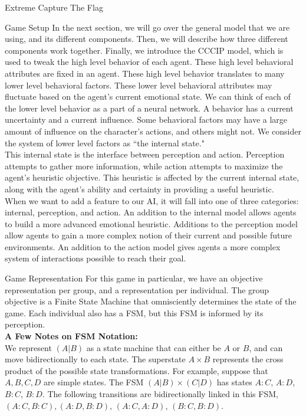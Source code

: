 \documentclass[11pt]{article}
\begin{document}
\begin{section}{Extreme Capture The Flag}
\begin{subsection}{Game Setup}
In the next section, we will go over the general model that we are using, and its different components. Then, we will describe how three different components work together. Finally, we introduce the CCCIP model, which is used to tweak the high level behavior of each agent. These high level behavioral attributes are fixed in an agent. These high level behavior translates to many lower level behavioral factors. These lower level behavioral attributes may fluctuate based on the agent's current emotional state. We can think of each of the lower level behavior as a part of a neural network. A behavior has a current uncertainty and a current influence. Some behavioral factors may have a large amount of influence on the character's actions, and others might not. We consider the system of lower level factors as ``the internal state."\\

This internal state is the interface between perception and action. Perception attempts to gather more information, while action attempts to maximize the agent's heuristic objective. This heuristic is affected by the current internal state, along with the agent's ability and certainty in providing a useful heuristic.\\

When we want to add a feature to our AI, it will fall into one of three categories: internal, perception, and action. An addition to the internal model allows agents to build a more advanced emotional heuristic. Additions to the perception model allow agents to gain a more complex notion of their current and possible future environments. An addition to the action model gives agents a more complex system of interactions possible to reach their goal.\\  
\end{subsection}
\begin{subsection}{Game Representation}
For this game in particular, we have an objective representation per group, and a representation per individual. The group objective is a Finite State Machine that omnisciently determines the state of the game. Each individual also has a FSM, but this FSM is informed by its perception. \\

\textbf{A Few Notes on FSM Notation:}\\
We represent $(A | B)$ as a state machine that can either be $A$ or $B$, and can move bidirectionally to each state. The superstate $A \times B$ represents the cross product of the possible state transformations. For example, suppose that $A, B, C, D$ are simple states. The FSM $(A | B) \times (C | D)$ has states $A : C$, $A:D$, $B:C$, $B:D$. The following transitions are bidirectionally linked in this FSM, $(A:C, B:C), (A:D, B:D)$, $(A:C, A:D)$, $(B:C, B:D)$.\\


\end{subsection}
\end{section}
\end{document}
